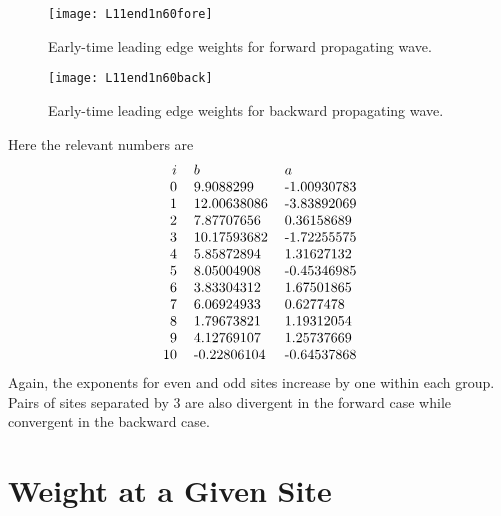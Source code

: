 \documentclass[11pt]{article}
\begin{document}
\begin{figure}
	\centering
	\texttt{[image: L11end1n60fore]}
	\caption{Early-time leading edge weights for forward propagating wave.}
	\label{fig:L11end1n60fore}
\end{figure}
\begin{figure}
	\centering
	\texttt{[image: L11end1n60back]}
	\caption{Early-time leading edge weights for backward propagating wave.}
	\label{fig:L11end1n60back}
\end{figure}

Here the relevant numbers are
\begin{align*}
\begin{tabular}{rll}
$i$ & $b$ & $a$\\
0 & 9.9088299  &-1.00930783\\
1 & 12.00638086 & -3.83892069\\
2  &7.87707656  &0.36158689\\
3  &10.17593682  &-1.72255575\\
4  &5.85872894  &1.31627132\\
5  &8.05004908 &-0.45346985\\
6  &3.83304312 & 1.67501865\\
7  &6.06924933 & 0.6277478 \\
8  &1.79673821 & 1.19312054\\
9  &4.12769107 & 1.25737669\\
10 &-0.22806104& -0.64537868
\end{tabular}
\end{align*}
Again, the exponents for even and odd sites increase by one within each group. Pairs of sites separated by 3 are also divergent in the forward case while convergent in the backward case.

\section{Weight at a Given Site}
\end{document}
